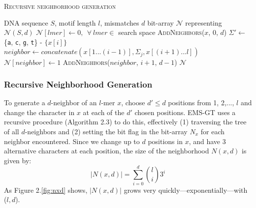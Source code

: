 \documentclass[oneside,12pt]{DISCSthesis}
\begin{document}
{		{ %
			\noindent \hspace*{6pt}{\bf Algorithm 2.3} \textsc{Recursive neighborhood generation}\small
			\begin{algorithmic}[1]
				\label{alg:recursive-nbr-gen}
				\Require DNA sequence $S$, motif length $l$, mismatches $d$
				\Ensure bit-array $\mathcal{N}$ representing $\mathcal{N}(S,d)$ \vspace*{6pt}
				\State $\mathcal{N}[lmer] \leftarrow 0,\ \ \forall\ lmer \in $ search space 
				\State \textsc{AddNeighbors}($x$, 0, $d$) \hspace*{79pt}
				\EndFor
				\newline
				\State {}
						\State $\Sigma' \leftarrow$ \{\texttt{a}, \texttt{c}, \texttt{g}, \texttt{t}\} - $\{x[i]\}$ \hspace*{79pt}
							\State $neighbor \leftarrow concatenate(x[1...(i-1)],\Sigma_{j},x[(i+1)...l])$
							\State $\mathcal{N}[neighbor] \leftarrow 1$				\hspace*{100pt}
								\State \textsc{AddNeighbors}($neighbor$, $i+1$, $d-1$)
							\EndIf
						\EndFor
					\EndFor
				\EndProcedure
				\State\Return $\mathcal{N}$
				\end{algorithmic}
			}\normalsize{}\newpage

		\subsubsection{Recursive Neighborhood Generation}
			To generate a $d$-neighbor of an $l$-mer $x$, choose $d' \leq d$ positions from 1, 2,..., $l$ and change the character in $x$ at each of the $d'$ chosen positions. EMS-GT uses a recursive procedure (Algorithm 2.3) to do this, effectively (1) traversing the tree of all $d$-neighbors and (2) setting the bit flag in the bit-array $N_x$ for each neighbor encountered. Since we change up to $d$ positions in $x$, and have 3 alternative characters at each position, the size of the neighborhood $N(x,d)$ is given by:
			 \begin{equation}
				\left|N(x,d)\right| = \sum_{i=0}^d \binom{l}{i} 3^{i}
				\end{equation}
			\noindent As Figure 2.\ref{fig:nxd} shows, $|N(x,d)|$ grows very quickly---exponentially---with ($l,d$).\vspace*{5mm}

}
\end{document}
